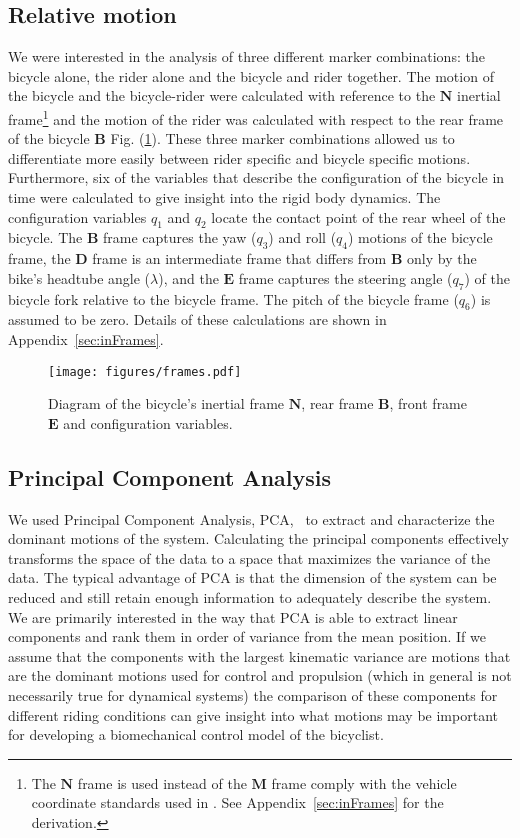 \documentclass[smallextended]{svjour3}     %
\begin{document}
\subsection{Relative motion}
\label{sec:relativeMotion}
We were interested in the analysis of three different marker combinations: the
bicycle alone, the rider alone and the bicycle and rider together. The motion of the bicycle and the
bicycle-rider were calculated with reference to the $\mathbf{N}$ inertial
frame\footnote[1]{The $\mathbf{N}$ frame is used instead of the $\mathbf{M}$ frame
comply with the vehicle coordinate standards used in \cite{Meijaard2007}. See
Appendix~\ref{sec:inFrames} for the derivation.} and the motion of the rider was calculated
with respect to the rear frame of
the bicycle $\mathbf{B}$ Fig. (\ref{fig:frames}). These three marker
combinations allowed us to differentiate more easily between rider specific and
bicycle specific motions. Furthermore, six of the variables that describe the
configuration of the bicycle in time were calculated to give insight into the
rigid body dynamics. The configuration variables $q_1$ and $q_2$ locate the
contact point of the rear wheel of the bicycle. The $\mathbf{B}$ frame captures
the yaw ($q_3$) and roll ($q_4$) motions
of the bicycle frame, the $\mathbf{D}$ frame is an intermediate frame that
differs from $\mathbf{B}$ only by the bike's headtube angle ($\lambda$), and the
$\mathbf{E}$ frame captures the steering angle ($q_7$) of the bicycle fork relative to
the bicycle frame. The pitch of the bicycle frame ($q_6$) is assumed to be zero. Details of these calculations are shown in
Appendix~\ref{sec:inFrames}.
\begin{figure}[tbp]
    \begin{center}
        \texttt{[image: figures/frames.pdf]}
    \end{center}
    \caption{Diagram of the bicycle's inertial frame $\mathbf{N}$, rear frame $\mathbf{B}$, front frame $\mathbf{E}$ and configuration variables.}
    \label{fig:frames}
\end{figure}

\subsection{Principal Component Analysis}
\label{sec:pca}
We used Principal Component Analysis, PCA,~\cite{Jolliffe2002} to extract and
characterize the dominant motions of the system. Calculating the principal
components effectively transforms the space of the data to a space that
maximizes the variance of the data. The typical advantage of PCA is that the
dimension of the system can be reduced and still retain enough information to
adequately describe the system. We are primarily interested in the way that PCA
is able to extract linear components and rank them in order of variance from
the mean position. If we assume that the components with the largest kinematic
variance are motions that are the dominant motions used for control and
propulsion (which in general is not necessarily true for dynamical systems) the
comparison of these components for different riding conditions can give insight
into what motions may be important for developing a biomechanical control model
of the bicyclist.
\end{document}
